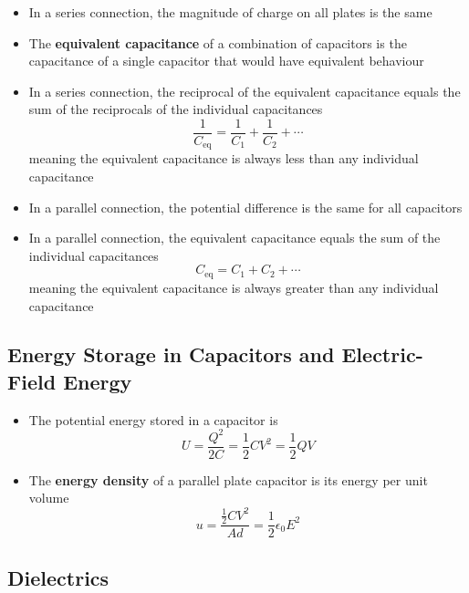 \documentclass{article}
\begin{document}
\begin{itemize}
  \item In a series connection, the magnitude of charge on all plates is the same

  \item The \textbf{equivalent capacitance} of a combination of capacitors is the capacitance of a single capacitor that would have equivalent behaviour

  \item In a series connection, the reciprocal of the equivalent capacitance equals the sum of the reciprocals of the individual capacitances \[\frac{1}{C_\textrm{eq}} = \frac{1}{C_1} + \frac{1}{C_2} + \cdots\] meaning the equivalent capacitance is always less than any individual capacitance

  \item In a parallel connection, the potential difference is the same for all capacitors

  \item In a parallel connection, the equivalent capacitance equals the sum of the individual capacitances \[C_\textrm{eq} = C_1 + C_2 + \cdots\] meaning the equivalent capacitance is always greater than any individual capacitance
\end{itemize}

\subsection{Energy Storage in Capacitors and Electric-Field Energy}

\begin{itemize}
  \item The potential energy stored in a capacitor is \[U = \frac{Q^2}{2 C} = \frac{1}{2} C V^2 = \frac{1}{2} Q V\]

  \item The \textbf{energy density} of a parallel plate capacitor is its energy per unit volume \[u = \frac{\frac{1}{2} C V^2}{A d} = \frac{1}{2} \epsilon_0 E^2\]
\end{itemize}

\subsection{Dielectrics}
\end{document}
